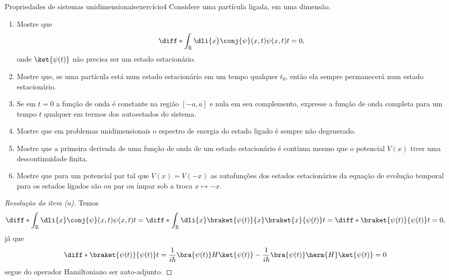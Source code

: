 \begin{exercício}{Propriedades de sistemas unidimensionais}{exercício4}
    Considere uma partícula ligada, em uma dimensão.
    \begin{enumerate}[label=(\alph*)]
        \item Mostre que
            \begin{equation*}
                \diff*{\int_{\mathbb{R}}\dli{x}\conj{\psi}(x,t)\psi(x,t)}{t} = 0,
            \end{equation*}
            onde \(\ket{\psi(t)}\) não precisa ser um estado estacionário.
        \item Mostre que, se uma partícula está num estado estacionário em um tempo qualquer \(t_0\), então ela sempre permanecerá num estado estacionário.
        \item Se em \(t = 0\) a função de onda é constante na região \([-a,a]\) e nula em seu complemento, expresse a função de onda completa para um tempo \(t\) qualquer em termos dos autoestados do sistema.
        \item Mostre que em problemas unidimensionais o espectro de energia do estado ligado é sempre não degenerado.
        \item Mostre que a primeira derivada de uma função de onda de um estado estacionário é contínua mesmo que o potencial \(V(x)\) tiver uma descontinuidade finita.
        \item Mostre que para um potencial par tal que \(V(x) = V(-x)\) as autofunções dos estados estacionários da equação de evolução temporal para os estados ligados são ou par ou ímpar sob a troca \(x \mapsto -x\).
\end{enumerate}
\end{exercício}
\begin{proof}[Resolução do item (a)]
    Temos
    \begin{equation*}
        \diff*{\int_{\mathbb{R}}\dli{x}\conj{\psi}(x,t)\psi(x,t)}{t} = \diff*{\int_{\mathbb{R}}\dli{x} \braket{\psi(t)}{x} \braket{x}{\psi(t)}}{t} = \diff*{\braket{\psi(t)}{\psi(t)}}{t} = 0,
    \end{equation*}
    já que
    \begin{equation*}
        \diff*{\braket{\psi(t)}{\psi(t)}}{t} = \frac{1}{i\hbar}\bra{\psi(t)}H\ket{\psi(t)} - \frac{1}{i\hbar}\bra{\psi(t)}\herm{H}\ket{\psi(t)} = 0
    \end{equation*}
    segue do operador Hamiltoniano ser auto-adjunto.
\end{proof}

